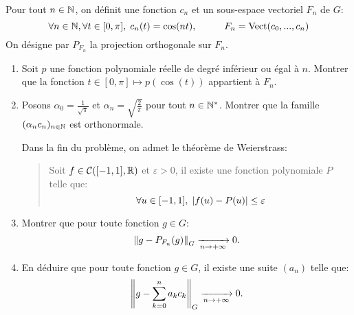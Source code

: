 Pour tout $n\in \mathbb{N}$, on définit une fonction $c_{n}$ et un sous-espace vectoriel $F_n$ de $G$:
\begin{displaymath}
\forall n \in \mathbb{N},  \forall t\in [0,\pi],\; c_{n}(t) = \cos(nt), \hspace{1cm} F_{n} = \operatorname{Vect}(c_{0},...,c_{n})
\end{displaymath}
On désigne par $P_{F_{n}}$ la projection orthogonale sur $F_{n}$. 

\begin{enumerate}
\item Soit $p$ une fonction polynomiale réelle de degré inférieur ou égal à $n$. Montrer que la fonction $t\in [0,\pi] \mapsto p(\cos(t))$ appartient à $F_{n}$.

\item Posons $\alpha_0= \frac{1}{\sqrt{\pi}}$ et $\alpha_n=\sqrt{\frac{2}{\pi}}$ pour tout $n\in \mathbb{N}^*$. Montrer que la famille $(\alpha_{n}c_{n})_{n\in \mathbb{N}}$ est orthonormale. 

Dans la fin du problème, on admet le théorème de Weierstrass: 
\begin{quote}
Soit $f\in \mathcal{C}([-1,1],\mathbb{R})$ et $\varepsilon >0$, il existe une fonction polynomiale $P$ telle que:
\begin{displaymath}
\forall u\in [-1,1], \;\left\vert f(u)-P(u)\right\vert\leq \varepsilon  
\end{displaymath}
\end{quote}

\item  Montrer que pour toute fonction $g\in G$:
$$\left\Vert g-P_{F_{n}}(g)\right\Vert_{G}\xrightarrow[n\to +\infty]{}0.$$

\item En déduire que pour toute fonction $g\in G$, il existe une suite $(a_{n})$ telle que:
$$\left\Vert g-\sum_{k=0}^{n}a_{k}c_{k}\right\Vert_{G}\xrightarrow[n\to +\infty]{}0.$$ 
\end{enumerate}
